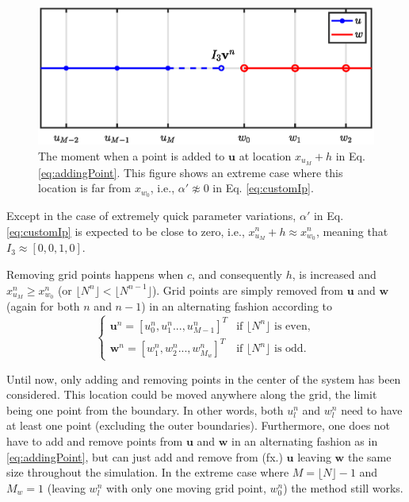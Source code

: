 \begin{figure}[ht]
    \centering
\includegraphics[width=\figwidth\columnwidth]{Figures/addingGridPoint4.eps}
\caption{\label{fig:addingPoint}{The moment when a point is added to $\mathbf{u}$ at location $x_{u_M} + h$ in Eq. \eqref{eq:addingPoint}. This figure shows an extreme case where this location is far from $x_{w_0}$, i.e., $\alpha' \not\approx 0$ in Eq. \eqref{eq:customIp}.}}
\end{figure}

Except in the case of extremely quick parameter variations, $\alpha'$ in Eq. \eqref{eq:customIp} is expected to be close to zero, i.e., $x_{u_M}^n + h \approx x_{w_0}^n$, meaning that $I_3 \approx [0, 0, 1, 0]$. %

Removing grid points happens when $c$, and consequently $h$, is increased and $x_{u_M}^n \geq x_{w_0}^n$ (or $\lfloor N^n\rfloor < \lfloor N^{n-1}\rfloor$). %
Grid points are simply removed from $\mathbf{u}$ and $\mathbf{w}$ (again for both $n$ and $n-1$) in an alternating fashion according to
\begin{equation}\label{eq:removingPoint}
\begin{cases}
    \mathbf{u}^n = [u_0^n, u_1^n ..., u_{M-1}^n]^T & \text{if $\lfloor N^n\rfloor$ is even}, \\
     \mathbf{w}^n = [w_1^n, w_2^n ..., w_{M_w}^n]^T & \text{if $\lfloor N^n\rfloor$ is odd}.
    \end{cases}
\end{equation}

Until now, only adding and removing points in the center of the system has been considered. This location could be moved anywhere along the grid, the limit being one point from the boundary. In other words, both $u_l^n$ and $w_l^n$ need to have at least one point (excluding the outer boundaries). Furthermore, one does not have to add and remove points from $\mathbf{u}$ and $\mathbf{w}$ in an alternating fashion as in \eqref{eq:addingPoint}, but can just add and remove from (fx.) $\mathbf{u}$ leaving $\mathbf{w}$ the same size throughout the simulation. In the extreme case where $M = \lfloor N\rfloor - 1$ and $M_w = 1$ (leaving $w_l^n$ with only one moving grid point, $w_0^n$) the method still works.

